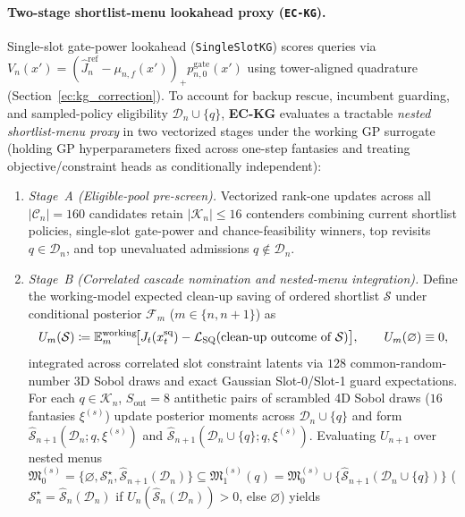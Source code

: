 \paragraph{Two-stage shortlist-menu lookahead proxy (\texttt{EC-KG}).}
Single-slot gate-power lookahead (\texttt{SingleSlotKG}) scores queries via $V_n(x') = (\hat{J}_n^{\mathrm{ref}} - \mu_{n,f}(x'))_+ p_{n,0}^{\mathrm{gate}}(x')$ using tower-aligned quadrature (Section~\ref*{ec:kg_correction}). To account for backup rescue, incumbent guarding, and sampled-policy eligibility $\mathcal{D}_n \cup \{q\}$, \textbf{EC-KG} evaluates a tractable \emph{nested shortlist-menu proxy} in two vectorized stages under the working GP surrogate (holding GP hyperparameters fixed across one-step fantasies and treating objective/constraint heads as conditionally independent):
\begin{enumerate}
  \item \emph{Stage~A (Eligible-pool pre-screen).} Vectorized rank-one updates across all $|\mathcal{C}_n| = 160$ candidates retain $|\mathcal{K}_n| \leq 16$ contenders combining current shortlist policies, single-slot gate-power and chance-feasibility winners, top revisits $q \in \mathcal{D}_n$, and top unevaluated admissions $q \notin \mathcal{D}_n$.
  \item \emph{Stage~B (Correlated cascade nomination and nested-menu integration).} Define the working-model expected clean-up saving of ordered shortlist $\mathcal{S}$ under conditional posterior $\mathcal{F}_m$ ($m \in \{n, n+1\}$) as
  \begin{equation}\label{eq:working_cascade_utility}
    U_m(\mathcal{S}) \coloneqq \mathbb{E}_m^{\mathrm{working}}\!\big[J_t(x_t^{\mathrm{sq}}) - \mathcal{L}_{\mathrm{SQ}}(\text{clean-up outcome of }\mathcal{S})\big],
    \qquad U_m(\varnothing) \equiv 0,
  \end{equation}
  integrated across correlated slot constraint latents via $128$ common-random-number 3D Sobol draws and exact Gaussian Slot-0/Slot-1 guard expectations. For each $q \in \mathcal{K}_n$, $S_{\mathrm{out}}=8$ antithetic pairs of scrambled 4D Sobol draws ($16$ fantasies $\xi^{(s)}$) update posterior moments across $\mathcal{D}_n \cup \{q\}$ and form $\hat{\mathcal{S}}_{n+1}(\mathcal{D}_n; q, \xi^{(s)})$ and $\hat{\mathcal{S}}_{n+1}(\mathcal{D}_n \cup \{q\}; q, \xi^{(s)})$. Evaluating $U_{n+1}$ over nested menus $\mathfrak{M}_0^{(s)} = \{\varnothing, \mathcal{S}_n^\star, \hat{\mathcal{S}}_{n+1}(\mathcal{D}_n)\} \subseteq \mathfrak{M}_1^{(s)}(q) = \mathfrak{M}_0^{(s)} \cup \{\hat{\mathcal{S}}_{n+1}(\mathcal{D}_n \cup \{q\})\}$ ($\mathcal{S}_n^\star = \hat{\mathcal{S}}_n(\mathcal{D}_n)$ if $U_n(\hat{\mathcal{S}}_n(\mathcal{D}_n)) > 0$, else $\varnothing$) yields

\end{enumerate}
